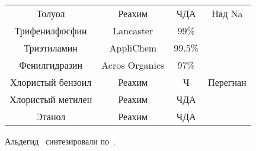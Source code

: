 \begin{table}[]
\begin{small}
\begin{tabular}{cccc}
            Толуол                & Реахим                 & ЧДА              & Над Na              \\
            Трифенилфосфин        & Lancaster              & 99\%             &                     \\
            Триэтиламин           & AppliChem              & 99.5\%           &                     \\
            Фенилгидразин         & Acros Organics         & 97\%             &                     \\
            Хлористый бензоил     & Реахим                 & Ч                & Перегнан            \\
            Хлористый метилен     & Реахим                 & ЧДА              &                     \\
            Этанол                & Реахим                 & ЧДА              &                     \\
            \bottomrule
        \end{tabular}
    \end{small}
\end{table}

Альдегид~ синтезировали по~\cite{2016a,2010}.

